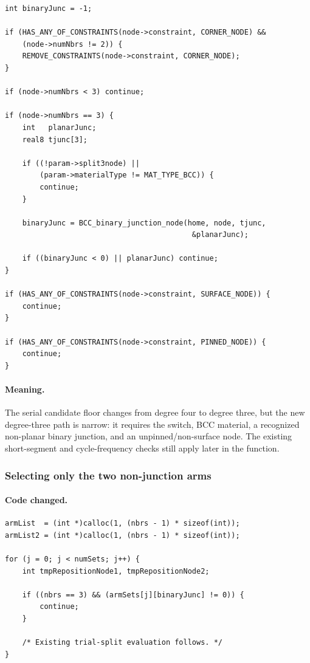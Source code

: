 \documentclass[11pt]{article}
\begin{document}
\begin{lstlisting}[style=cpp]
int binaryJunc = -1;

if (HAS_ANY_OF_CONSTRAINTS(node->constraint, CORNER_NODE) &&
    (node->numNbrs != 2)) {
    REMOVE_CONSTRAINTS(node->constraint, CORNER_NODE);
}

if (node->numNbrs < 3) continue;

if (node->numNbrs == 3) {
    int   planarJunc;
    real8 tjunc[3];

    if ((!param->split3node) ||
        (param->materialType != MAT_TYPE_BCC)) {
        continue;
    }

    binaryJunc = BCC_binary_junction_node(home, node, tjunc,
                                           &planarJunc);

    if ((binaryJunc < 0) || planarJunc) continue;
}

if (HAS_ANY_OF_CONSTRAINTS(node->constraint, SURFACE_NODE)) {
    continue;
}

if (HAS_ANY_OF_CONSTRAINTS(node->constraint, PINNED_NODE)) {
    continue;
}
\end{lstlisting}

\paragraph{Meaning.}
The serial candidate floor changes from degree four to degree three, but the
new degree-three path is narrow: it requires the switch, BCC material, a
recognized non-planar binary junction, and an unpinned/non-surface node.  The
existing short-segment and cycle-frequency checks still apply later in the
function.

\subsubsection{Selecting only the two non-junction arms}

\paragraph{Code changed.}

\begin{lstlisting}[style=cpp]
armList  = (int *)calloc(1, (nbrs - 1) * sizeof(int));
armList2 = (int *)calloc(1, (nbrs - 1) * sizeof(int));

for (j = 0; j < numSets; j++) {
    int tmpRepositionNode1, tmpRepositionNode2;

    if ((nbrs == 3) && (armSets[j][binaryJunc] != 0)) {
        continue;
    }

    /* Existing trial-split evaluation follows. */
}
\end{lstlisting}
\end{document}
